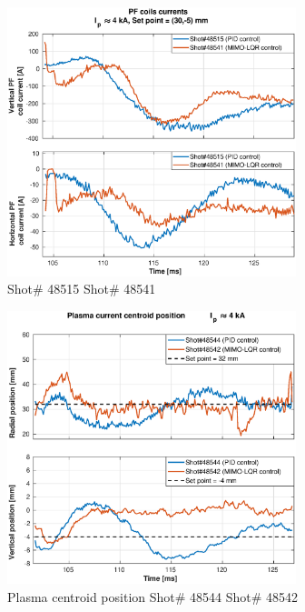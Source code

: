 \begin{figure}
	\centering
	\includegraphics[width=0.75\textwidth]{Chp5/PIDvsMIMO_515_541_curr_2.eps}
	\caption{   Shot\# 48515 Shot\# 48541}
\end{figure}

\begin{figure}
	\centering
	\includegraphics[width=0.75\textwidth]{Chp5/PIDvsMIMO_544_542_2.eps}
	\caption{Plasma centroid position  Shot\# 48544 Shot\# 48542}
\end{figure}

